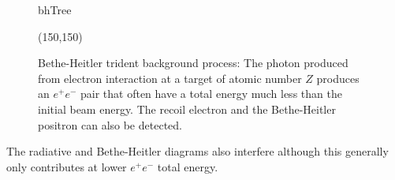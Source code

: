 \begin{figure}[htb]
    \begin{center}
	\begin{fmffile}{bhTree}
	\begin{fmfgraph*}(150,150)
	\fmfstraight
		\fmffreeze
		\fmffreeze	
	\end{fmfgraph*}
	\end{fmffile}
  	\end{center}
    	\caption[Bethe-Heitler background]{Bethe-Heitler trident background process: The photon produced from electron interaction at a target of atomic number $Z$ produces an $e^+e^-$ pair that often have a total energy much less than the initial beam energy. The recoil electron and the Bethe-Heitler positron can also be detected.}
   	 \label{fig:bhTree}	
\end{figure}

The radiative and Bethe-Heitler diagrams also interfere although this generally only contributes at lower $e^+e^-$ total energy. 